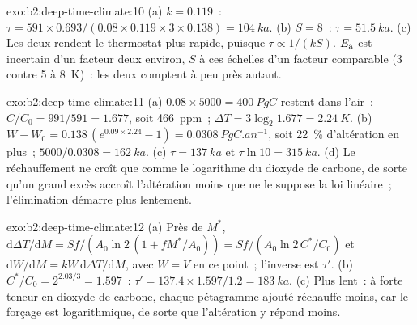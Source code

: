 \begin{solution}{exo:b2:deep-time-climate:10}
(a) $k = 0.119$~: $\tau = 591\times0.693/(0.08\times0.119\times3\times0.138) = \qty{104}{ka}$.
(b) $S = 8$~: $\tau = \qty{51.5}{ka}$. (c) Les deux rendent le thermostat plus rapide, puisque $\tau \propto
1/(kS)$. $E_{\text a}$ est incertain d'un facteur deux environ, $S$ à ces échelles d'un facteur
comparable (3 contre 5 à \qty{8}{K})~: les deux comptent à peu près autant.
\end{solution}

\begin{solution}{exo:b2:deep-time-climate:11}
(a) $0.08\times5000 = \qty{400}{PgC}$ restent dans l'air~: $C/C_0 = 991/591 = 1.677$, soit
\qty{466}{ppm}~; $\Delta T = 3\log_2 1.677 = \qty{2.24}{K}$. (b) $W - W_0 = 0.138\,(e^{0.09\times2.24}
- 1) = \qty{0.0308}{PgC.an^{-1}}$, soit \qty{22}{\percent} d'altération en plus~; $5000/0.0308 =
\qty{162}{ka}$. (c) $\tau = \qty{137}{ka}$ et $\tau\ln10 = \qty{315}{ka}$. (d) Le réchauffement ne croît que
comme le logarithme du dioxyde de carbone, de sorte qu'un grand excès accroît l'altération moins que ne le suppose la
loi linéaire~; l'élimination démarre plus lentement.
\end{solution}

\begin{solution}{exo:b2:deep-time-climate:12}
(a) Près de $M^*$, $\mathrm d\Delta T/\mathrm dM = Sf/(A_0\ln 2\,(1 + fM^*/A_0)) = Sf/(A_0\ln 2\,
C^*/C_0)$ et $\mathrm dW/\mathrm dM = kW\,\mathrm d\Delta T/\mathrm dM$, avec $W = V$ en ce point~; l'inverse est
$\tau'$. (b) $C^*/C_0 = 2^{2.03/3} = 1.597$~: $\tau' = 137.4\times1.597/1.2 =
\qty{183}{ka}$. (c) Plus lent~: à forte teneur en dioxyde de carbone, chaque pétagramme ajouté réchauffe moins,
car le forçage est logarithmique, de sorte que l'altération y répond moins.
\end{solution}

